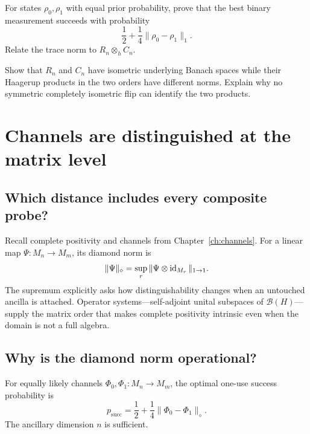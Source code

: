 \begin{exercise}
For states $\rho_0,\rho_1$ with equal prior probability, prove that the best
binary measurement succeeds with probability
\[
\frac12+\frac14\|\rho_0-\rho_1\|_1.
\]
Relate the trace norm to $R_n\otimes_hC_n$.
\end{exercise}

\begin{exercise}
Show that $R_n$ and $C_n$ have isometric underlying Banach spaces while their
Haagerup products in the two orders have different norms.  Explain why no
symmetric completely isometric flip can identify the two products.
\end{exercise}


\chapter{Channels are distinguished at the matrix level}
\label{ch:diamond}



\section{Which distance includes every composite probe?}

Recall complete positivity and channels from Chapter~\ref{ch:channels}.  For
a linear map $\Psi:M_n\to M_m$, its diamond norm is
\[
\|\Psi\|_\diamond
=\sup_r\|\Psi\otimes\operatorname{id}_{M_r}\|_{1\to1}.
\]
The supremum explicitly asks how distinguishability changes when an untouched
ancilla is attached.  Operator systems---self-adjoint unital subspaces of
$\mathcal B(H)$---supply the matrix order that makes complete positivity
intrinsic even when the domain is not a full algebra.

\section{Why is the diamond norm operational?}

\begin{theorem}
For equally likely channels $\Phi_0,\Phi_1:M_n\to M_m$, the optimal one-use
success probability is
\[
p_{\mathrm{succ}}
=\frac12+\frac14\|\Phi_0-\Phi_1\|_\diamond.
\]
The ancillary dimension $n$ is sufficient.
\end{theorem}

